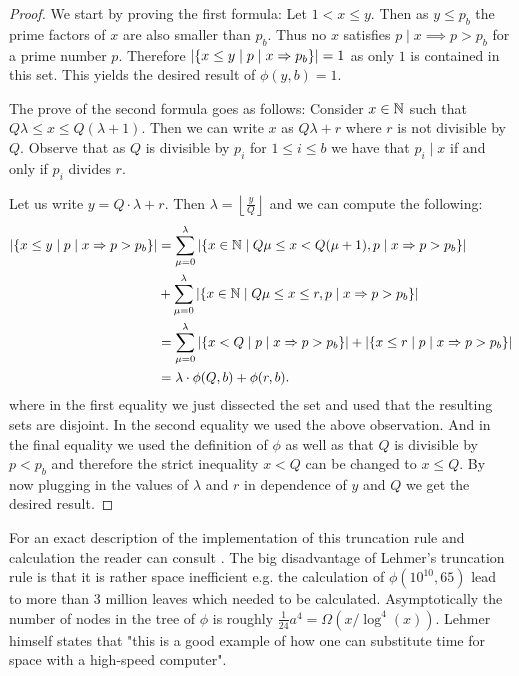 \begin{proof}
	We start by proving the first formula:
	Let $1 < x \leq y$. Then as $y \leq p_{b}$ the prime factors of $x$ are also smaller than $p_{b}$.
	Thus no $x$ satisfies $p \mid x \implies p > p_{b}$ for a prime number $p$. Therefore
	$\abs{\{x \leq y \mid p\mid x \Rightarrow p_{b}\} } = 1$ as only $1$ is contained in this set.
	This yields the desired result of $\phi(y,b) = 1$.

	The prove of the second formula goes as follows:
	Consider $x \in \mathbb{N}$ such that $Q \lambda \leq x \leq Q (\lambda+1)$. Then we can write $x$ as
	$Q \lambda + r$ where $r$ is not divisible by $Q$.
	Observe that as $Q$ is divisible by $p_{i}$ for $1 \leq i \leq b$ we have that $p_{i} \mid x$ if and only if
	$p_{i}$ divides $r$. 

	Let us write $y = Q \cdot \lambda + r$. Then $\lambda = \left\lfloor \frac{y}{Q} \right\rfloor $ and we can compute the following:
	\begin{align*}
		\abs{\{x \leq y \mid p\mid x \Rightarrow p > p_{b}\}} &= \sum_{\mu=0}^{\lambda} \abs{\{x \in \mathbb{N} \mid Q\mu \leq x < Q(\mu+1), p \mid x \Rightarrow p > p_{b}\}}\\ 
		&+ \sum_{\mu = 0}^{\lambda} \abs{\{x \in \mathbb{N} \mid Q\mu \leq x \leq r, p \mid x \Rightarrow p > p_{b}\}} \\
		&= \sum_{\mu = 0}^{\lambda} \abs{\{x < Q \mid p \mid x \Rightarrow p > p_{b}\}} + \abs{\{x \leq r \mid p \mid x \Rightarrow p > p_{b}\} }\\
		&=  \lambda \cdot \phi(Q,b) + \phi(r,b)
	.\end{align*}
	where in the first equality we just dissected the set and used that the resulting sets are disjoint.
	In the second equality we used the above observation. And in the final equality we used the definition of $\phi$ as well as that $Q$ is divisible by $p < p_{b}$
	and therefore the strict inequality $x < Q$ can be changed to $x \leq Q$.
	By now plugging in the values of $\lambda$ and $r$ in dependence of $y$ and $Q$ we get the desired result.
\end{proof}

For an exact description of the implementation of this truncation rule and calculation the reader can consult \cite{lehmer59}.
The big disadvantage of Lehmer's truncation rule is that it is rather space inefficient e.g.
the calculation of $\phi(10^{10},65)$ lead to more than $3$ million leaves which needed to be calculated.
Asymptotically the number of nodes in the tree of $\phi$ is roughly $\frac{1}{24} a^{4} = \Omega(x / \log^{4}(x))$.
Lehmer himself states that "this is a good example of how one can substitute time for space with a high-speed computer".

